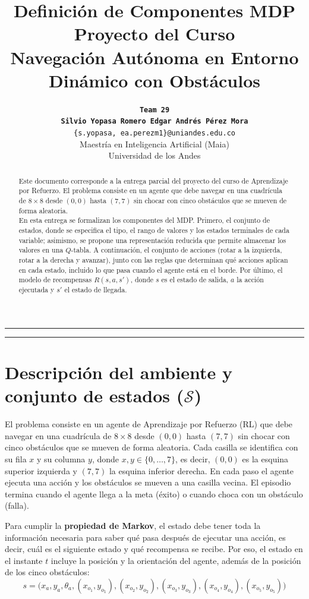 \documentclass[11pt,a4paper]{article}
\title{\vspace{-1.5cm}\textbf{\LARGE \textcolor{primary}{Definición de Componentes MDP}}\\[0.3cm]
\Large \textcolor{secondary}{Proyecto del Curso \\
Navegación Autónoma en Entorno Dinámico con Obstáculos}}
\author{\textbf{\tt\small Team 29}\\
{\tt\small \textbf{Silvio Yopasa Romero} \qquad \textbf{Edgar Andrés Pérez Mora}}\\
{\tt\small \{s.yopasa, ea.perezm1\}@uniandes.edu.co}\\
\small Maestría en Inteligencia Artificial (Maia)\\
\small Universidad de los Andes}
\begin{document}
\maketitle
\thispagestyle{fancy}
\hrule \vspace{0.3cm}

\begin{abstract}
Este documento corresponde a la entrega parcial del proyecto del curso de Aprendizaje por Refuerzo. El problema consiste en un agente que debe navegar en una cuadrícula de $8 \times 8$ desde $(0,0)$ hasta $(7,7)$ sin chocar con cinco obstáculos que se mueven de forma aleatoria. \\

En esta entrega se formalizan los componentes del MDP. Primero, el conjunto de estados, donde se especifica el tipo, el rango de valores y los estados terminales de cada variable; asimismo, se propone una representación reducida que permite almacenar los valores en una $Q$-tabla. A continuación, el conjunto de acciones (rotar a la izquierda, rotar a la derecha y avanzar), junto con las reglas que determinan qué acciones aplican en cada estado, incluido lo que pasa cuando el agente está en el borde. Por último, el modelo de recompensas $R(s, a, s')$, donde $s$ es el estado de salida, $a$ la acción ejecutada y $s'$ el estado de llegada.
\end{abstract}

\vspace{0.3cm} \hrule \vspace{0.4cm}

\section{Descripción del ambiente y conjunto de estados ($\mathcal{S}$)}
El problema consiste en un agente de Aprendizaje por Refuerzo (RL) que debe navegar en una cuadrícula de $8 \times 8$ desde $(0,0)$ hasta $(7,7)$ sin chocar con cinco obstáculos que se mueven de forma aleatoria. Cada casilla se identifica con su fila $x$ y su columna $y$, donde $x, y \in \{0, \dots, 7\}$, es decir, $(0,0)$ es la esquina superior izquierda y $(7,7)$ la esquina inferior derecha. En cada paso el agente ejecuta una acción y los obstáculos se mueven a una casilla vecina. El episodio termina cuando el agente llega a la meta (éxito) o cuando choca con un obstáculo (falla).

Para cumplir la \textbf{propiedad de Markov}, el estado debe tener toda la información necesaria para saber qué pasa después de ejecutar una acción, es decir, cuál es el siguiente estado y qué recompensa se recibe. Por eso, el estado en el instante $t$ incluye la posición y la orientación del agente, además de la posición de los cinco obstáculos:
\begin{equation}
    s = \big(x_a, y_a, \theta_a, (x_{o_1}, y_{o_1}), (x_{o_2}, y_{o_2}), (x_{o_3}, y_{o_3}), (x_{o_4}, y_{o_4}), (x_{o_5}, y_{o_5})\big)
\end{equation}
\end{document}
